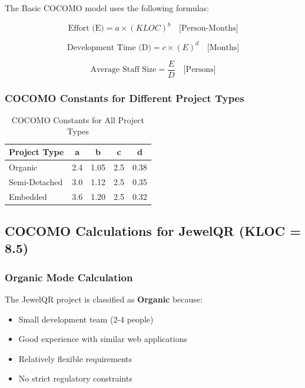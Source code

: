 \documentclass[12pt,a4paper]{article}
\begin{document}
The Basic COCOMO model uses the following formulas:

\begin{equation}
\text{Effort (E)} = a \times (KLOC)^b \quad \text{[Person-Months]}
\end{equation}

\begin{equation}
\text{Development Time (D)} = c \times (E)^d \quad \text{[Months]}
\end{equation}

\begin{equation}
\text{Average Staff Size} = \frac{E}{D} \quad \text{[Persons]}
\end{equation}

\subsubsection{COCOMO Constants for Different Project Types}

\begin{table}[H]
\centering
\begin{tabular}{|l|c|c|c|c|}
\hline
\textbf{Project Type} & \textbf{a} & \textbf{b} & \textbf{c} & \textbf{d} \\
\hline
Organic & 2.4 & 1.05 & 2.5 & 0.38 \\
\hline
Semi-Detached & 3.0 & 1.12 & 2.5 & 0.35 \\
\hline
Embedded & 3.6 & 1.20 & 2.5 & 0.32 \\
\hline
\end{tabular}
\caption{COCOMO Constants for All Project Types}
\end{table}

\subsection{COCOMO Calculations for JewelQR (KLOC = 8.5)}

\subsubsection{Organic Mode Calculation}

The JewelQR project is classified as \textbf{Organic} because:
\begin{itemize}
    \item Small development team (2-4 people)
    \item Good experience with similar web applications
    \item Relatively flexible requirements
    \item No strict regulatory constraints
\end{itemize}
\end{document}
